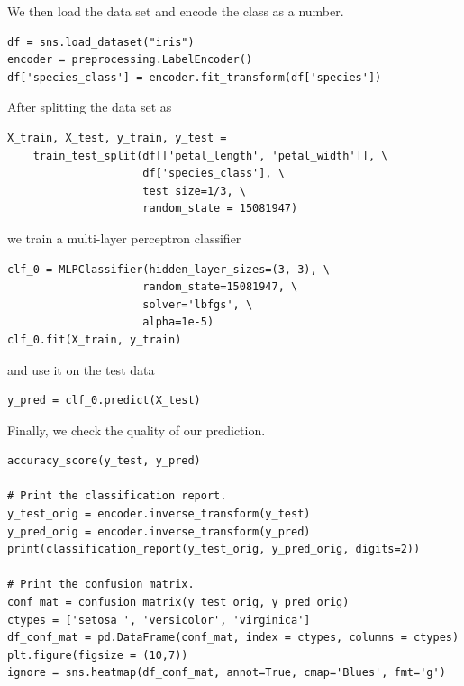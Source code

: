 \documentclass{article}
\numberwithin{equation}{section}
\begin{document}
We then load the data set and encode the class as a number.
\begin{verbatim}
df = sns.load_dataset("iris")
encoder = preprocessing.LabelEncoder()
df['species_class'] = encoder.fit_transform(df['species'])
\end{verbatim}

After splitting the data set as
\begin{verbatim}
X_train, X_test, y_train, y_test = 
	train_test_split(df[['petal_length', 'petal_width']], \
                     df['species_class'], \
                     test_size=1/3, \
                     random_state = 15081947)
\end{verbatim}
we train a multi-layer perceptron classifier 
\begin{verbatim}
clf_0 = MLPClassifier(hidden_layer_sizes=(3, 3), \
                     random_state=15081947, \
                     solver='lbfgs', \
                     alpha=1e-5)
clf_0.fit(X_train, y_train)
\end{verbatim}
and use it on the test data
\begin{verbatim}
y_pred = clf_0.predict(X_test)
\end{verbatim}
Finally, we check the quality of our prediction.
\begin{verbatim}
accuracy_score(y_test, y_pred)

# Print the classification report.
y_test_orig = encoder.inverse_transform(y_test)
y_pred_orig = encoder.inverse_transform(y_pred)
print(classification_report(y_test_orig, y_pred_orig, digits=2))

# Print the confusion matrix.
conf_mat = confusion_matrix(y_test_orig, y_pred_orig)
ctypes = ['setosa ', 'versicolor', 'virginica']
df_conf_mat = pd.DataFrame(conf_mat, index = ctypes, columns = ctypes)
plt.figure(figsize = (10,7))
ignore = sns.heatmap(df_conf_mat, annot=True, cmap='Blues', fmt='g')
\end{verbatim}


\end{document}
